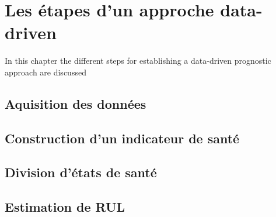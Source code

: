 \chapter{Les étapes d'un approche data-driven}
\begin{chapterintro}
    In this chapter the different steps for establishing a data-driven prognostic approach are discussed
\end{chapterintro}

\section{Aquisition des données}
\section{Construction d'un indicateur de santé}
\section{Division d'états de santé}
\section{Estimation de RUL}
